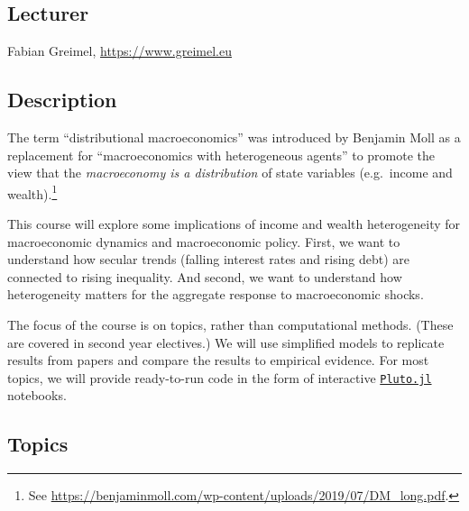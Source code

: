 \documentclass[a4paper,12pt]{article}
\begin{document}

\medskip {}

\subsection*{Lecturer}

Fabian Greimel, \url{https://www.greimel.eu}


\subsection*{Description}

The term ``distributional macroeconomics'' was introduced by Benjamin Moll as a replacement for ``macroeconomics with heterogeneous agents'' to promote the view that the \emph{macroeconomy is a distribution} of state variables (e.g.\ income and wealth).\footnote{See \url{ https://benjaminmoll.com/wp-content/uploads/2019/07/DM_long.pdf}.}

This course will explore some implications of income and wealth heterogeneity for macroeconomic dynamics and macroeconomic policy. First, we want to understand how secular trends (falling interest rates and rising debt) are connected to rising inequality. And second, we want to understand how heterogeneity matters for the aggregate response to macroeconomic shocks.

The focus of the course is on topics, rather than computational methods. (These are covered in second year electives.) We will use simplified models to replicate results from papers and compare the results to empirical evidence. For most topics, we will provide ready-to-run code in the form of interactive \href{https://github.com/fonsp/Pluto.jl}{\texttt{Pluto.jl}} notebooks. 


\subsection*{Topics}
\end{document}

